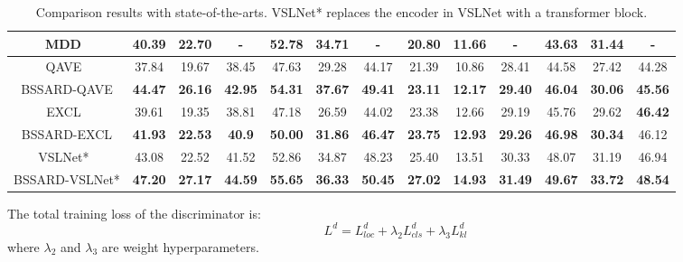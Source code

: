 \begin{table}[t]
\begin{tabular}{c c c c | c c c|c c c | c c c}
		MDD~\cite{lan2022closer} & 40.39 & 22.70 & - & 52.78 & 34.71 & - & 20.80 & 11.66 & - & 43.63 & 31.44 & - \\
		
		\midrule
		QAVE~\cite{hao2022query} & 37.84 & 19.67 & 38.45 & 47.63 & 29.28 & 44.17 &
		21.39 & 10.86 & 28.41 & 44.58 & 27.42 & 44.28 \\
		
		BSSARD-QAVE & \bf 44.47 & \bf 26.16 & \bf 42.95 & \bf 54.31 & \bf 37.67 & \bf 49.41 & \bf 23.11 & \bf 12.17 &	\bf 29.40 & \bf 46.04 & \bf 30.06 & \bf 45.56 \\
		
		\midrule
		EXCL~\cite{RN3} & 39.61 & 19.35 & 38.81 & 47.18 & 26.59 & 44.02 & 23.38 & 12.66 &	29.19 & 45.76 & 29.62 & \bf 46.42 \\
		BSSARD-EXCL &  {\bf 41.93} & {\bf 22.53} & {\bf 40.9} & \bf 50.00 & \bf 31.86 & \bf 46.47 & \bf 23.75 & \bf 12.93 & \bf 29.26 & \bf 46.98 & \bf 30.34 & 46.12 \\
		
		\midrule
		VSLNet*~\cite{RN4} & 43.08 & 22.52 & 41.52 & 52.86 & 34.87 &  48.23 &
		25.40 & 13.51 & 30.33 & 48.07 & 31.19 & 46.94\\
		BSSARD-VSLNet* & {\bf 47.20} & {\bf 27.17} & {\bf 44.59} & {\bf 55.65} & {\bf 36.33} & {\bf 50.45} &
		{\bf 27.02} & {\bf 14.93} & {\bf 31.49} & {\bf 49.67} & {\bf 33.72} & {\bf 48.54}\\
		
		\bottomrule
	\end{tabular}
	\caption{Comparison results with state-of-the-arts. VSLNet*	replaces the encoder in VSLNet with a transformer block.}
	\label{sota-redivided}
\end{table}


The total training loss of the discriminator is:
\begin{equation}
	L^d=L_{loc}^d+\lambda_{2} L_{cls}^d + \lambda_{3} L_{kl}^d
	\label{eq12}
\end{equation}
where $\lambda_{2}$ and $\lambda_{3}$ are weight hyperparameters.

